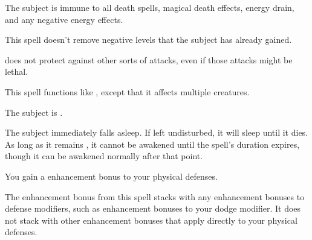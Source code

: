 \spellrng{\rngclose}
\spelldur{\durshort}
\begin{spelleffect}
  The subject is immune to all death spells, magical death effects, energy drain, and any negative energy effects.
\end{spelleffect}
\begin{spellnotes}
  This spell doesn't remove negative levels that the subject has already gained.
  \par {} does not protect against other sorts of attacks, even if those attacks might be lethal.
\end{spellnotes}

\spellrng{\rngmed}
\begin{spelleffect}
  This spell functions like , except that it affects multiple creatures.
\end{spelleffect}

\spellrng{\rngmed}
\spelldur{\durlong}
\begin{spellhealthy}
  The subject is \bewildered.
\end{spellhealthy}
\begin{spellblood}
  The subject immediately falls asleep. If left undisturbed, it will sleep until it dies. As long as it remains \bloodied, it cannot be awakened until the spell's duration expires, though it can be awakened normally after that point.
\end{spellblood}

\spelldur{\durlong}
\begin{spelleffect}
    You gain a  enhancement bonus to your physical defenses. \spellbonusscalingdescription
\end{spelleffect}
\begin{spellnotes}
    The enhancement bonus from this spell stacks with any enhancement bonuses to defense modifiers, such as enhancement bonuses to your dodge modifier. It does not stack with other enhancement bonuses that apply directly to your physical defenses. 
\end{spellnotes}

